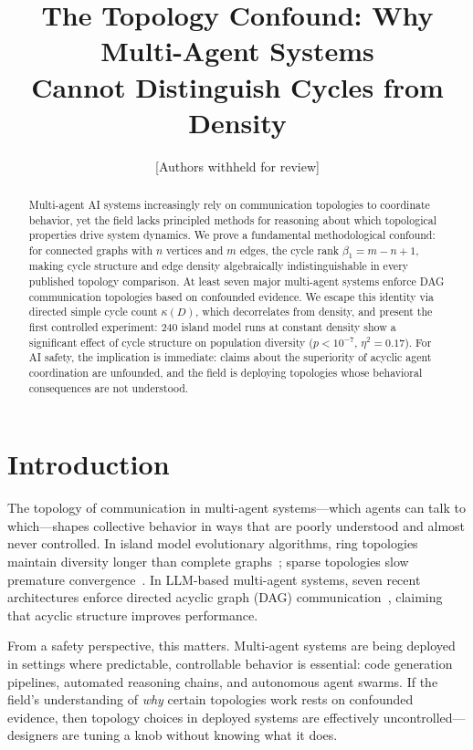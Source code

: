 \documentclass[10pt,twocolumn]{article}
\title{The Topology Confound: Why Multi-Agent Systems\\Cannot Distinguish Cycles from Density}
\author{
  [Authors withheld for review]
}
\date{}
\begin{document}
\maketitle

\begin{abstract}
Multi-agent AI systems increasingly rely on communication topologies to
coordinate behavior, yet the field lacks principled methods for reasoning
about which topological properties drive system dynamics. We prove a
fundamental methodological confound: for connected graphs with $n$ vertices
and $m$ edges, the cycle rank $\beta_1 = m - n + 1$, making cycle structure
and edge density algebraically indistinguishable in every published topology
comparison. At least seven major multi-agent systems enforce DAG
communication topologies based on confounded evidence. We escape this
identity via directed simple cycle count $\kappa(D)$, which decorrelates
from density, and present the first controlled experiment: 240 island model
runs at constant density show a significant effect of cycle structure on
population diversity ($p < 10^{-7}$, $\eta^2 = 0.17$). For AI safety, the
implication is immediate: claims about the superiority of acyclic agent
coordination are unfounded, and the field is deploying topologies whose
behavioral consequences are not understood.
\end{abstract}

\section{Introduction}
\label{sec:intro}

The topology of communication in multi-agent systems---which agents can
talk to which---shapes collective behavior in ways that are poorly
understood and almost never controlled. In island model evolutionary
algorithms, ring topologies maintain diversity longer than complete
graphs~\citep{tomassini2005spatially}; sparse topologies slow premature
convergence~\citep{alba2002parallel}. In LLM-based multi-agent systems,
seven recent architectures enforce directed acyclic graph (DAG)
communication~\citep{goagent2026,agentconductor2026,graphgrpo2026,ofamas2026,gdesigner2025,argdesigner2026,dochkina2026},
claiming that acyclic structure improves performance.

From a safety perspective, this matters. Multi-agent systems are being
deployed in settings where predictable, controllable behavior is essential:
code generation pipelines, automated reasoning chains, and autonomous agent
swarms. If the field's understanding of \emph{why} certain topologies work
rests on confounded evidence, then topology choices in deployed systems are
effectively uncontrolled---designers are tuning a knob without knowing what
it does.
\end{document}
